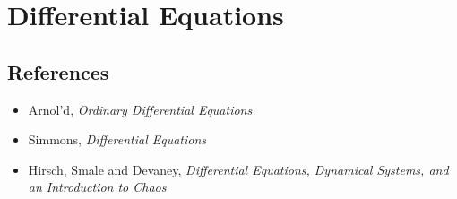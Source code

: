 \section{Differential Equations}
\subsection*{References}
\begin{itemize}
    \item Arnol'd, \emph{Ordinary Differential Equations}
    \item Simmons, \emph{Differential Equations}
    \item Hirsch, Smale and Devaney, \emph{Differential Equations, Dynamical
        Systems, and an Introduction to Chaos}
\end{itemize}
